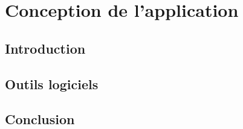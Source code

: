 \chapter{Conception de l'application}
\label{chap_concep}

\section*{Introduction}

\section{Outils logiciels}
\label{sec_logiciels}

\section*{Conclusion}